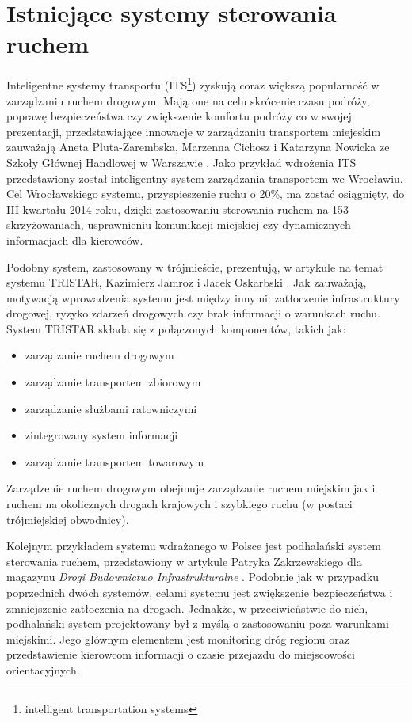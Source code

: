 \section{Istniejące systemy sterowania ruchem}
Inteligentne systemy transportu (ITS\footnote{intelligent transportation systems}) zyskują coraz większą popularność w zarządzaniu ruchem drogowym.
Mają one na celu skrócenie czasu podróży, poprawę bezpieczeństwa czy zwiększenie komfortu podróży co w swojej prezentacji, przedstawiające innowacje w zarządzaniu transportem miejeskim zauważają Aneta Pluta-Zarembska, Marzenna Cichosz i Katarzyna Nowicka ze Szkoły Głównej Handlowej w Warszawie \cite{pluta-zaremba+cichosz+nowicka}. Jako przykład wdrożenia ITS przedstawiony został inteligentny system zarządzania transportem we Wrocławiu. Cel Wrocławskiego systemu, przyspieszenie ruchu o 20\%,  ma zostać osiągnięty, do III kwartału 2014 roku, dzięki zastosowaniu sterowania ruchem na 153 skrzyżowaniach, usprawnieniu komunikacji miejskiej czy dynamicznych informacjach dla kierowców.

Podobny system, zastosowany w trójmieście, prezentują, w artykule na temat systemu TRISTAR, Kazimierz Jamroz i Jacek Oskarbski \cite{jamroz+oskarbski}. Jak zauważają, motywacją wprowadzenia systemu jest między innymi: zatłoczenie infrastruktury drogowej, ryzyko zdarzeń drogowych czy brak informacji o warunkach ruchu. System TRISTAR składa się z połączonych komponentów, takich jak:
\begin{itemize}
	\item zarządzanie ruchem drogowym
	\item zarządzanie transportem zbiorowym
	\item zarządzanie służbami ratowniczymi
	\item zintegrowany system informacji
	\item zarządzanie transportem towarowym
\end{itemize}
Zarządzenie ruchem drogowym obejmuje zarządzanie ruchem miejskim jak i ruchem na okolicznych drogach krajowych i szybkiego ruchu (w postaci trójmiejskiej obwodnicy).

Kolejnym przykładem systemu wdrażanego w Polsce jest podhalański system sterowania ruchem, przedstawiony w artykule Patryka Zakrzewskiego dla magazynu \textit{Drogi Budownictwo Infrastrukturalne} \cite{zakrzewski}. Podobnie jak w przypadku poprzednich dwóch systemów, celami systemu jest zwiększenie bezpieczeństwa i zmniejszenie zatłoczenia na drogach. Jednakże, w przeciwieństwie do nich, podhalański system projektowany był z myślą o zastosowaniu poza warunkami miejskimi. Jego głównym elementem jest monitoring dróg regionu oraz przedstawienie kierowcom informacji o czasie przejazdu do miejscowości orientacyjnych.